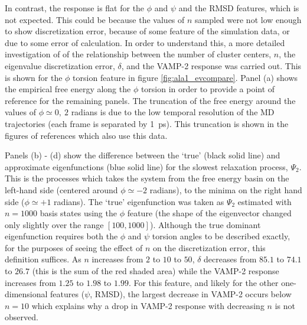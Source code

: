 In contrast, the response is flat for the $\phi$ and $\psi$ and the RMSD features, which is not expected. This could be because the values of $n$ sampled were not low enough to show discretization error, because of some feature of the simulation data, or due to some error of calculation. In order to understand this, a more detailed investigation of of the relationship between the number of cluster centers, $n$, the eigenvalue discretization error, $\delta$, and the VAMP-2 response was carried out. This is shown for the $\phi$ torsion feature in figure \ref{fig:ala1_evcompare}.  Panel (a) shows the empirical free energy along the $\phi$ torsion in order to provide a point of reference for the remaining panels. The truncation of the free energy around the values of $\phi \simeq 0,\ 2$ radians is due to the low temporal resolution  of the MD trajectories (each frame is separated by \SI{1}{\pico\second}). This truncation is shown in the figures of references \cite{nuskeCoarsegrainingMolecularSystems2019, liNeuralCanonicalTransformation2020, wangMachineLearningCoarseGrained2019, varolgunesInterpretableEmbeddingsMolecular2020, nuskeSpectralPropertiesEffective2021, mardtVAMPnetsDeepLearning2018} which also use this data.  

Panels (b) - (d) show the difference between the `true' (black solid line) and approximate eigenfunctions (blue solid line) for the slowest relaxation process, $\Psi_{2}$. This is the processes which takes the system from the free energy basin on the left-hand side (centered around $\phi\simeq -2$  radians), to the minima on the right hand side  ($\phi \simeq +1$ radians). The `true' eigenfunction was taken as $\Psi_{2}$ estimated with $n=1000$ basis states using the $\phi$ feature (the shape of the eigenvector changed only slightly over the range $[100, 1000]$). Although the true dominant eigenfunction requires both the $\phi$ and $\psi$ torsion angles to be described exactly, for the purposes of seeing the effect of $n$ on the discretization error, this definition suffices. As $n$ increases from $2$ to $10$ to $50$, $\delta$ decreases from $85.1$ to $74.1$ to $26.7$ (this is the sum of the red shaded area) while the VAMP-2 response increases from $1.25$ to $1.98$ to $1.99$. For this feature, and likely for the other one-dimensional features ($\psi$, RMSD), the largest decrease in VAMP-2 occurs below $n=10$ which explains why a drop in VAMP-2 response with decreasing $n$ is not observed. 


